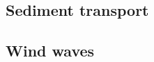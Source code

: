 \documentclass{report}
\newcommand{\todo}[1]{This section still has to be written by #1}
\begin{document}
		\subsection{Sediment transport}
		

		\subsection{Wind waves}
		








%	
%	

\end{document}
